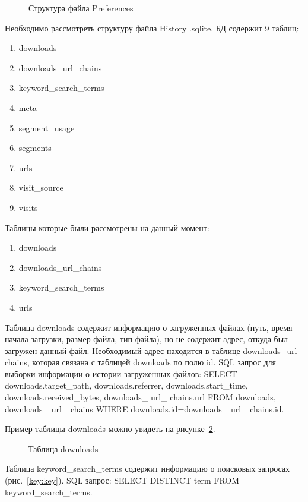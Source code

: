 \begin{figure}[h!]
\caption{Структура файла Preferences}
\label{preferences:preferences}
\end{figure}

Необходимо рассмотреть структуру файла History .sqlite. БД содержит 9 таблиц:
\begin{enumerate}
  \item downloads
  \item downloads\_url\_chains
  \item keyword\_search\_terms
  \item meta
  \item segment\_usage
  \item segments
  \item urls
  \item visit\_source
  \item visits 
\end{enumerate}


Таблицы которые были рассмотрены на данный момент: 
\begin{enumerate}
  \item downloads
  \item downloads\_url\_chains
  \item keyword\_search\_terms
  \item urls
\end{enumerate} 


Таблица downloads содержит информацию о загруженных файлах (путь, время начала загрузки, размер файла, тип файла), но не содержит адрес, откуда был загружен данный файл. Необходимый адрес находится в таблице downloads\_url\_ chains, которая  связана с таблицей downloads по полю id. 
SQL запрос для выборки информации о истории загруженных файлов: SELECT downloads.target\_path, downloads.referrer, downloads.start\_time, downloads.received\_bytes,
downloads\_ url\_ chains.url FROM downloads, downloads\_ url\_ chains WHERE downloads.id=downloads\_ url\_ chains.id.


Пример таблицы downloads можно увидеть на рисунке~\ref{down:down}.

\begin{figure}[ht]
\caption{Таблица downloads}
\label{down:down}
\end{figure}

Таблица  keyword\_search\_terms содержит информацию о поисковых запросах (рис.~\ref{key:key}). SQL запрос: SELECT DISTINCT term FROM keyword\_search\_terms.

